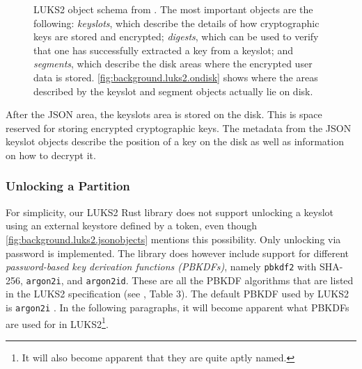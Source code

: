 \begin{figure}[htb!]
	\center
	\caption[
		LUKS2 object schema
	]{
		LUKS2 object schema from \cite{Broz2018}. The most important objects are the following: \emph{keyslots}, which describe the details of how cryptographic keys are stored and encrypted; \emph{digests}, which can be used to verify that one has successfully extracted a key from a keyslot; and \emph{segments}, which describe the disk areas where the encrypted user data is stored. \autoref{fig:background.luks2.ondisk} shows where the areas described by the keyslot and segment objects actually lie on disk.
	}
	\label{fig:background.luks2.jsonobjects}
\end{figure}

After the JSON area, the keyslots area is stored on the disk. This is space reserved for storing encrypted cryptographic keys. The metadata from the JSON keyslot objects describe the position of a key on the disk as well as information on how to decrypt it. 

\subsubsection{Unlocking a Partition}
\label{chap:background.luks2.unlocking}
For simplicity, our LUKS2 Rust library does not support unlocking a keyslot using an external keystore defined by a token, even though \autoref{fig:background.luks2.jsonobjects} mentions this possibility. Only unlocking via password is implemented. The library does however include support for different \emph{password-based key derivation functions (PBKDFs)}, namely \texttt{pbkdf2} with SHA-256, \texttt{argon2i}, and \texttt{argon2id}. These are all the PBKDF algorithms that are listed in the LUKS2 specification (see \cite{Broz2018}, Table 3). The default PBKDF used by LUKS2 is \texttt{argon2i} \cite{Cryptsetup2020}. In the following paragraphs, it will become apparent what PBKDFs are used for in LUKS2\footnote{\label{fn:background.luks2.pbkdfs} It will also become apparent that they are quite aptly named.}.

